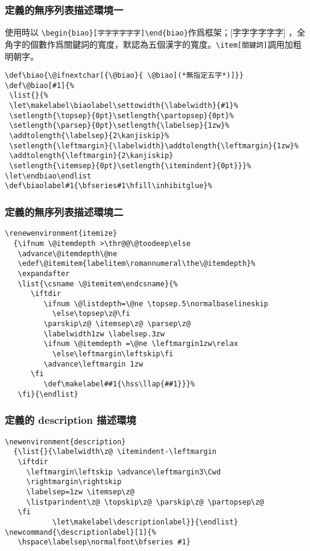 \subsubsection{定義的無序列表描述環境一}

\par%
使用時以 \verb+\begin{biao}[字字字字字字]\end{biao}+作爲框架；[字字字字字字]
，全角字的個數作爲關鍵詞的寬度，默認為五個漢字的寬度。\verb+\item[關鍵詞]+調用加粗明朝字。


\begin{lstlisting}[firstnumber=1152]
\def\biao{\@ifnextchar[{\@biao}{ \@biao[(*無指定五字*)]}}
\def\@biao[#1]{%
 \list{}{%
 \let\makelabel\biaolabel\settowidth{\labelwidth}{#1}%
 \setlength{\topsep}{0pt}\setlength{\partopsep}{0pt}%
 \setlength{\parsep}{0pt}\setlength{\labelsep}{1zw}%
 \addtolength{\labelsep}{2\kanjiskip}%
 \setlength{\leftmargin}{\labelwidth}\addtolength{\leftmargin}{1zw}%
 \addtolength{\leftmargin}{2\kanjiskip}
 \setlength{\itemsep}{0pt}\setlength{\itemindent}{0pt}}}%
\let\endbiao\endlist
\def\biaolabel#1{\bfseries#1\hfill\inhibitglue}%
\end{lstlisting}

\subsubsection{定義的無序列表描述環境二}

\begin{lstlisting}[firstnumber=1165]
\renewenvironment{itemize}
  {\ifnum \@itemdepth >\thr@@\@toodeep\else
   \advance\@itemdepth\@ne
   \edef\@itemitem{labelitem\romannumeral\the\@itemdepth}%
   \expandafter
   \list{\csname \@itemitem\endcsname}{%
      \iftdir
         \ifnum \@listdepth=\@ne \topsep.5\normalbaselineskip
           \else\topsep\z@\fi
         \parskip\z@ \itemsep\z@ \parsep\z@
         \labelwidth1zw \labelsep.3zw
         \ifnum \@itemdepth =\@ne \leftmargin1zw\relax
           \else\leftmargin\leftskip\fi
         \advance\leftmargin 1zw
      \fi
         \def\makelabel##1{\hss\llap{##1}}}%
   \fi}{\endlist}
\end{lstlisting}

\subsubsection{定義的 description 描述環境}

\begin{lstlisting}[firstnumber=1182]
\newenvironment{description}
  {\list{}{\labelwidth\z@ \itemindent-\leftmargin
   \iftdir
     \leftmargin\leftskip \advance\leftmargin3\Cwd
     \rightmargin\rightskip
     \labelsep=1zw \itemsep\z@
     \listparindent\z@ \topskip\z@ \parskip\z@ \partopsep\z@
   \fi
           \let\makelabel\descriptionlabel}}{\endlist}
\newcommand{\descriptionlabel}[1]{%
   \hspace\labelsep\normalfont\bfseries #1}
\end{lstlisting}


